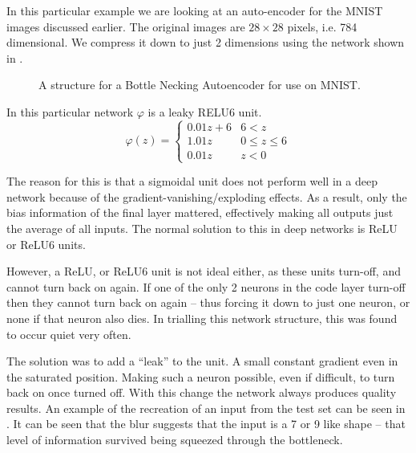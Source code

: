 \documentclass[12pt,parskip]{komatufte}
\begin{document}
In this particular example we are looking at an auto-encoder for the MNIST images discussed earlier.
The original images are $28 \times 28$ pixels, i.e. 784 dimensional.
We compress it down to just 2 dimensions using the network shown in .

\begin{figure}
	\caption{A structure for a Bottle Necking Autoencoder for use on MNIST.}
	\label{fig-autoencoder}
	\resizebox{\textwidth}{!}{}
\end{figure}

\FloatBarrier
In this particular network $\varphi$ is a leaky RELU6 unit.
\begin{equation}
\varphi(z)=\begin{cases}
    0.01z+6 & 6<z \\
	1.01z & 0 \le z \le 6 \\
	0.01z & z < 0
\end{cases}
\end{equation}

The reason for this is that a sigmoidal unit does not perform well in a deep network because of the gradient-vanishing/exploding effects.
As a result, only the bias information of the final layer mattered, effectively making all outputs just the average of all inputs.
The normal solution to this in deep networks is ReLU or ReLU6 units.

However, a ReLU, or ReLU6 unit is not ideal either,
as these units turn-off, and cannot turn back on again.
If one of the only 2 neurons in the code layer turn-off then they cannot turn back on again -- thus forcing it down to just one neuron, or none if that neuron also dies.
In trialling this network structure, this was found to occur quiet very often.

The solution was to add a ``leak'' to the unit.
A small constant gradient even in the saturated position.
Making such a neuron possible, even if difficult, to turn back on once turned off.
With this change the network always produces quality results.
An example of the recreation of an input from the test set can be seen in 
 . 
It can be seen that the blur suggests that the input is a 7 or 9 like shape -- that level of information survived being squeezed through the bottleneck.
\end{document}
